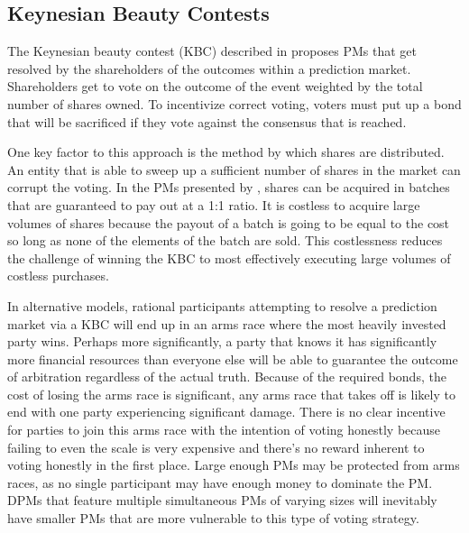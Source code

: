 \documentclass[onecolumn]{article}
\begin{document}

\subsection{Keynesian Beauty Contests}
The Keynesian beauty contest (KBC) described in \cite{pmob} proposes PMs that get resolved by the shareholders of the outcomes within a prediction market.
Shareholders get to vote on the outcome of the event weighted by the total number of shares owned.
To incentivize correct voting, voters must put up a bond that will be sacrificed if they vote against the consensus that is reached.

One key factor to this approach is the method by which shares are distributed.
An entity that is able to sweep up a sufficient number of shares in the market can corrupt the voting.
In the PMs presented by \cite{pmob}, shares can be acquired in batches that are guaranteed to pay out at a 1:1 ratio.
It is costless to acquire large volumes of shares because the payout of a batch is going to be equal to the cost so long as none of the elements of the batch are sold.
This costlessness reduces the challenge of winning the KBC to most effectively executing large volumes of costless purchases.

In alternative models, rational participants attempting to resolve a prediction market via a KBC will end up in an arms race where the most heavily invested party wins.
Perhaps more significantly, a party that knows it has significantly more financial resources than everyone else will be able to guarantee the outcome of arbitration regardless of the actual truth.
Because of the required bonds, the cost of losing the arms race is significant, any arms race that takes off is likely to end with one party experiencing significant damage.
There is no clear incentive for parties to join this arms race with the intention of voting honestly because failing to even the scale is very expensive and there's no reward inherent to voting honestly in the first place.
Large enough PMs may be protected from arms races, as no single participant may have enough money to dominate the PM.
DPMs that feature multiple simultaneous PMs of varying sizes will inevitably have smaller PMs that are more vulnerable to this type of voting strategy.
\end{document}
